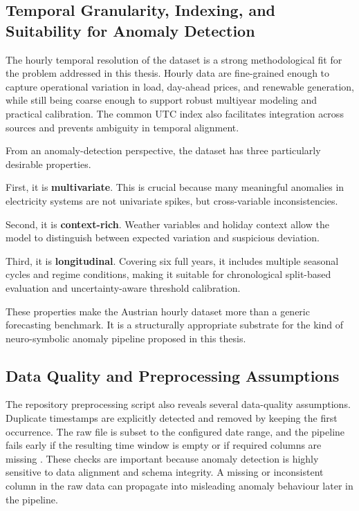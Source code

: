 \subsection{Temporal Granularity, Indexing, and Suitability for Anomaly Detection}

The hourly temporal resolution of the dataset is a strong methodological fit for the problem addressed in this thesis. Hourly data are fine-grained enough to capture operational variation in load, day-ahead prices, and renewable generation, while still being coarse enough to support robust multiyear modeling and practical calibration. The common UTC index also facilitates integration across sources and prevents ambiguity in temporal alignment.

From an anomaly-detection perspective, the dataset has three particularly desirable properties.

First, it is \textbf{multivariate}. This is crucial because many meaningful anomalies in electricity systems are not univariate spikes, but cross-variable inconsistencies.

Second, it is \textbf{context-rich}. Weather variables and holiday context allow the model to distinguish between expected variation and suspicious deviation.

Third, it is \textbf{longitudinal}. Covering six full years, it includes multiple seasonal cycles and regime conditions, making it suitable for chronological split-based evaluation and uncertainty-aware threshold calibration.

These properties make the Austrian hourly dataset more than a generic forecasting benchmark. It is a structurally appropriate substrate for the kind of neuro-symbolic anomaly pipeline proposed in this thesis.

\subsection{Data Quality and Preprocessing Assumptions}

The repository preprocessing script also reveals several data-quality assumptions. Duplicate timestamps are explicitly detected and removed by keeping the first occurrence. The raw file is subset to the configured date range, and the pipeline fails early if the resulting time window is empty or if required columns are missing \cite{repo_thesis_grid_anomaly}. These checks are important because anomaly detection is highly sensitive to data alignment and schema integrity. A missing or inconsistent column in the raw data can propagate into misleading anomaly behaviour later in the pipeline.

